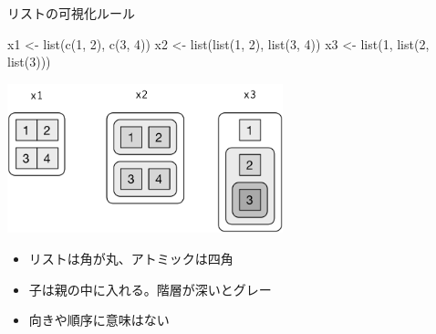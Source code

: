 \documentclass[
  ignorenonframetext,
]{beamer}
\newenvironment{Shaded}{\begin{snugshade}}{\end{snugshade}}
\newcommand{\DecValTok}[1]{\textcolor[rgb]{0.00,0.00,0.81}{#1}}
\newcommand{\FunctionTok}[1]{\textcolor[rgb]{0.00,0.00,0.00}{#1}}
\newcommand{\NormalTok}[1]{#1}
\newcommand{\OtherTok}[1]{\textcolor[rgb]{0.56,0.35,0.01}{#1}}
\providecommand{\tightlist}{%
  \setlength{\itemsep}{0pt}\setlength{\parskip}{0pt}}
\begin{document}
\begin{frame}[fragile]{リストの可視化ルール}
\protect\hypertarget{ux30eaux30b9ux30c8ux306eux53efux8996ux5316ux30ebux30fcux30eb}{}
\begin{Shaded}
\begin{Highlighting}[]
\NormalTok{x1 }\OtherTok{\textless{}{-}} \FunctionTok{list}\NormalTok{(}\FunctionTok{c}\NormalTok{(}\DecValTok{1}\NormalTok{, }\DecValTok{2}\NormalTok{), }\FunctionTok{c}\NormalTok{(}\DecValTok{3}\NormalTok{, }\DecValTok{4}\NormalTok{))}
\NormalTok{x2 }\OtherTok{\textless{}{-}} \FunctionTok{list}\NormalTok{(}\FunctionTok{list}\NormalTok{(}\DecValTok{1}\NormalTok{, }\DecValTok{2}\NormalTok{), }\FunctionTok{list}\NormalTok{(}\DecValTok{3}\NormalTok{, }\DecValTok{4}\NormalTok{))}
\NormalTok{x3 }\OtherTok{\textless{}{-}} \FunctionTok{list}\NormalTok{(}\DecValTok{1}\NormalTok{, }\FunctionTok{list}\NormalTok{(}\DecValTok{2}\NormalTok{, }\FunctionTok{list}\NormalTok{(}\DecValTok{3}\NormalTok{)))}
\end{Highlighting}
\end{Shaded}

\begin{center}
\includegraphics[width=80mm]{../img/lists-structure.png}
\end{center}

\begin{itemize}
\tightlist
\item
  リストは角が丸、アトミックは四角
\item
  子は親の中に入れる。階層が深いとグレー
\item
  向きや順序に意味はない
\end{itemize}
\end{frame}
\end{document}

